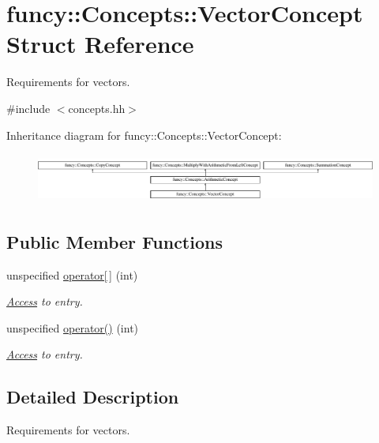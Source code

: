 \hypertarget{structfuncy_1_1Concepts_1_1VectorConcept}{\section{funcy\-:\-:Concepts\-:\-:Vector\-Concept Struct Reference}
\label{structfuncy_1_1Concepts_1_1VectorConcept}
}


Requirements for vectors.  




{\ttfamily \#include $<$concepts.\-hh$>$}

Inheritance diagram for funcy\-:\-:Concepts\-:\-:Vector\-Concept\-:\begin{figure}[H]
\begin{center}
\leavevmode
\includegraphics[height=1.656805cm]{structfuncy_1_1Concepts_1_1VectorConcept}
\end{center}
\end{figure}
\subsection*{Public Member Functions}
\begin{DoxyCompactItemize}
\item 
unspecified \hyperlink{structfuncy_1_1Concepts_1_1VectorConcept_aa31db9d0079199df0e942f62492caad9}{operator\mbox{[}$\,$\mbox{]}} (int)
\begin{DoxyCompactList}\small\item\em \hyperlink{namespacefuncy_1_1Access}{Access} to entry. \end{DoxyCompactList}\item 
unspecified \hyperlink{structfuncy_1_1Concepts_1_1VectorConcept_a2099e403c1ff9a2977758599319219cd}{operator()} (int)
\begin{DoxyCompactList}\small\item\em \hyperlink{namespacefuncy_1_1Access}{Access} to entry. \end{DoxyCompactList}\end{DoxyCompactItemize}


\subsection{Detailed Description}
Requirements for vectors. 

